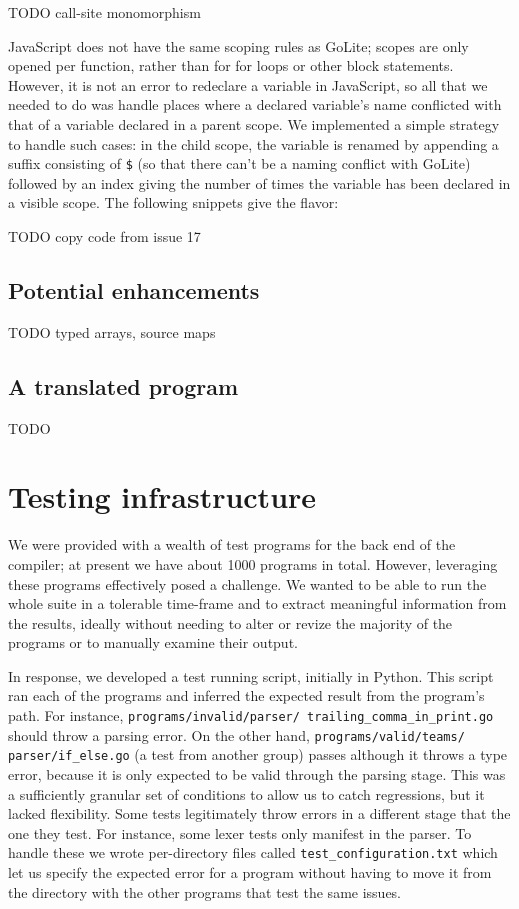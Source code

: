 \documentclass[oneside]{article}
\begin{document}
TODO call-site monomorphism

JavaScript does not have the same scoping rules as GoLite; scopes are only opened per function, rather than for for loops or other block statements. However, it is not an error to redeclare a variable in JavaScript, so all that we needed to do was handle places where a declared variable's name conflicted with that of a variable declared in a parent scope. We implemented a simple strategy to handle such cases: in the child scope, the variable is renamed by appending a suffix consisting of \texttt{\$} (so that there can't be a naming conflict with GoLite) followed by an index giving the number of times the variable has been declared in a visible scope. The following snippets give the flavor:

TODO copy code from issue 17

\subsection{Potential enhancements}
TODO typed arrays, source maps

\subsection{A translated program}
TODO

\section{Testing infrastructure}
We were provided with a wealth of test programs for the back end of the compiler; at present we have about 1000 programs in total. However, leveraging these programs effectively posed a challenge. We wanted to be able to run the whole suite in a tolerable time-frame and to extract meaningful information from the results, ideally without needing to alter or revize the majority of the programs or to manually examine their output.

In response, we developed a test running script, initially in Python. This script ran each of the programs and inferred the expected result from the program's path. For instance, \texttt{programs/invalid/parser/ trailing\_comma\_in\_print.go} should throw a parsing error. On the other hand, \texttt{programs/valid/teams/ parser/if\_else.go} (a test from another group) passes although it throws a type error, because it is only expected to be valid through the parsing stage. This was a sufficiently granular set of conditions to allow us to catch regressions, but it lacked flexibility. Some tests legitimately throw errors in a different stage that the one they test. For instance, some lexer tests only manifest in the parser. To handle these we wrote per-directory files called \texttt{test\_configuration.txt} which let us specify the expected error for a program without having to move it from the directory with the other programs that test the same issues.
\end{document}
